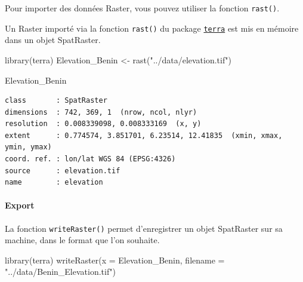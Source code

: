 \documentclass[
  letterpaper,
  DIV=11,
  numbers=noendperiod]{scrartcl}
\let\oldparagraph\paragraph
\renewcommand{\paragraph}[1]{\oldparagraph{#1}\mbox{}}
\newenvironment{Shaded}{\begin{snugshade}}{\end{snugshade}}
\newcommand{\AttributeTok}[1]{\textcolor[rgb]{0.40,0.45,0.13}{#1}}
\newcommand{\FunctionTok}[1]{\textcolor[rgb]{0.28,0.35,0.67}{#1}}
\newcommand{\NormalTok}[1]{\textcolor[rgb]{0.00,0.23,0.31}{#1}}
\newcommand{\OtherTok}[1]{\textcolor[rgb]{0.00,0.23,0.31}{#1}}
\newcommand{\StringTok}[1]{\textcolor[rgb]{0.13,0.47,0.30}{#1}}
\begin{document}
Pour importer des données Raster, vous pouvez utiliser la fonction
\texttt{rast()}.

\begin{tcolorbox}[enhanced jigsaw, opacityback=0, bottomrule=.15mm, titlerule=0mm, left=2mm, bottomtitle=1mm, title=\textcolor{quarto-callout-important-color}{\faExclamation}\hspace{0.5em}{Important}, opacitybacktitle=0.6, breakable, colbacktitle=quarto-callout-important-color!10!white, leftrule=.75mm, colframe=quarto-callout-important-color-frame, rightrule=.15mm, toprule=.15mm, coltitle=black, arc=.35mm, colback=white, toptitle=1mm]

Un Raster importé via la fonction \texttt{rast()} du package
\href{https://rspatial.org/index.html}{\texttt{terra}} est mis en
mémoire dans un objet SpatRaster.

\end{tcolorbox}

\begin{Shaded}
\begin{Highlighting}[]
\FunctionTok{library}\NormalTok{(terra)}
\NormalTok{Elevation\_Benin }\OtherTok{\textless{}{-}} \FunctionTok{rast}\NormalTok{(}\StringTok{"../data/elevation.tif"}\NormalTok{) }

\NormalTok{Elevation\_Benin}
\end{Highlighting}
\end{Shaded}

\begin{verbatim}
class       : SpatRaster 
dimensions  : 742, 369, 1  (nrow, ncol, nlyr)
resolution  : 0.008339098, 0.008333169  (x, y)
extent      : 0.774574, 3.851701, 6.23514, 12.41835  (xmin, xmax, ymin, ymax)
coord. ref. : lon/lat WGS 84 (EPSG:4326) 
source      : elevation.tif 
name        : elevation 
\end{verbatim}

\hypertarget{export-3}{%
\paragraph{Export}\label{export-3}}

La fonction \texttt{writeRaster()} permet d'enregistrer un objet
SpatRaster sur sa machine, dans le format que l'on souhaite.

\begin{Shaded}
\begin{Highlighting}[]
\FunctionTok{library}\NormalTok{(terra)}
\FunctionTok{writeRaster}\NormalTok{(}\AttributeTok{x =}\NormalTok{ Elevation\_Benin, }\AttributeTok{filename =} \StringTok{"../data/Benin\_Elevation.tif"}\NormalTok{)}
\end{Highlighting}
\end{Shaded}
\end{document}
